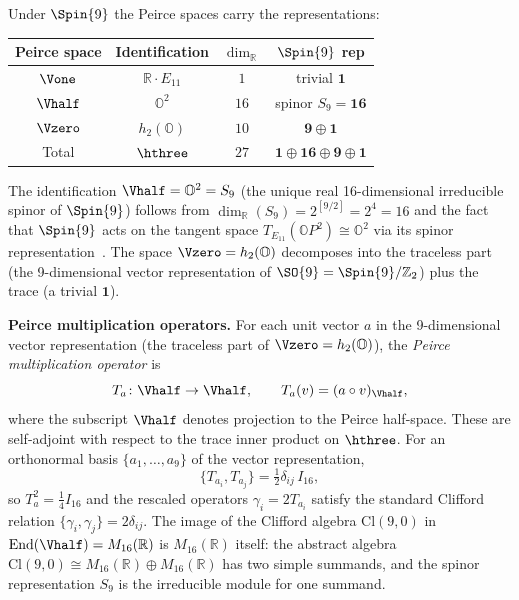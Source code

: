 Under $\Spin{9}$ the Peirce spaces carry the representations:
\begin{center}
\renewcommand{\arraystretch}{1.2}
\begin{tabular}{@{}cccc@{}}
  \toprule
  Peirce space & Identification & $\dim_\mathbb{R}$ & $\Spin{9}$ rep \\
  \midrule
  $\Vone$ & $\mathbb{R}\cdot E_{11}$ & $1$ & trivial $\mathbf{1}$ \\
  $\Vhalf$ & $\mathbb{O}^2$ & $16$ & spinor $S_9 = \mathbf{16}$ \\
  $\Vzero$ & $h_2(\mathbb{O})$ & $10$ & $\mathbf{9}\oplus\mathbf{1}$ \\
  \midrule
  Total & $\hthree$ & $27$ & $\mathbf{1}\oplus\mathbf{16}\oplus\mathbf{9}\oplus\mathbf{1}$ \\
  \bottomrule
\end{tabular}
\end{center}

The identification $\Vhalf = \mathbb{O}^2 = S_9$
(the unique real 16-dimensional irreducible spinor of $\Spin{9}$)
follows from
$\dim_\mathbb{R}(S_9) = 2^{[9/2]} = 2^4 = 16$
and the fact that $\Spin{9}$ acts on the tangent space
$T_{E_{11}}(\mathbb{O}P^2) \cong \mathbb{O}^2$ via its
spinor representation~\cite{Baez2002,Yokota2009}.
The space $\Vzero = h_2(\mathbb{O})$ decomposes into the
traceless part (the 9-dimensional vector representation of
$\SO{9} = \Spin{9}/\mathbb{Z}_2$) plus the trace (a trivial
$\mathbf{1}$).

\medskip
\noindent\textbf{Peirce multiplication operators.}
For each unit vector $a$ in the 9-dimensional vector representation
(the traceless part of $\Vzero = h_2(\mathbb{O})$), the
\emph{Peirce multiplication operator} is
\begin{equation}\label{eq:T_a-def}
  T_a \colon \Vhalf \to \Vhalf,
  \qquad
  T_a(v) = (a \circ v)_{\Vhalf},
\end{equation}
where the subscript $\Vhalf$ denotes projection to the
Peirce half-space.  These are self-adjoint with respect to the
trace inner product on $\hthree$.  For an orthonormal basis
$\{a_1,\ldots,a_9\}$ of the vector representation,
\begin{equation}\label{eq:T_a-clifford}
  \{T_{a_i}, T_{a_j}\} = \tfrac{1}{2}\delta_{ij}\,I_{16},
\end{equation}
so $T_a^2 = \tfrac{1}{4}I_{16}$ and the rescaled operators
$\gamma_i = 2T_{a_i}$ satisfy the standard Clifford relation
$\{\gamma_i,\gamma_j\} = 2\delta_{ij}$.  The image of the
Clifford algebra $\mathrm{Cl}(9,0)$ in
$\mathrm{End}(\Vhalf) = M_{16}(\mathbb{R})$ is
$M_{16}(\mathbb{R})$ itself: the abstract algebra
$\mathrm{Cl}(9,0) \cong M_{16}(\mathbb{R})
\oplus M_{16}(\mathbb{R})$ has two simple summands, and the spinor
representation $S_9$ is the irreducible module for one summand.

